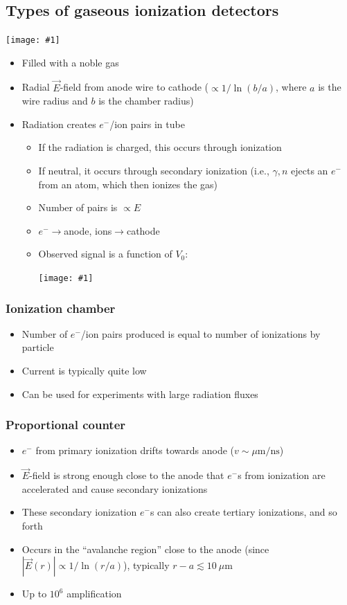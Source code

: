 \documentclass[11pt]{article}
\newcommand{\E}{\ensuremath{\vec{E}}}
\newcommand{\ns}{\text{ns}}
\newcommand{\mum}{\mu\text{m}}
\newcommand{\el}{\ensuremath{e^{-}}\xspace}
\newcommand{\embedimgw}[2]{\begin{center}\texttt{[image: \#1]}\end{center}}
\begin{document}
\subsection{Types of gaseous ionization detectors}
\embedimgw{figs/gasionization.png}{.8}
\begin{itemize}
  \item Filled with a noble gas
  \item Radial $\E$-field from anode wire to cathode ($\propto 1/\ln(b/a)$, where $a$ is the wire radius and $b$ is the chamber radius)
  \item Radiation creates $\el$/ion pairs in tube
  \begin{itemize}
    \item If the radiation is charged, this occurs through ionization
    \item If neutral, it occurs through secondary ionization (i.e., $\gamma,n$ ejects an $\el$ from an atom, which then ionizes the gas)
    \item Number of pairs is $\propto E$
    \item $\el\rightarrow$anode, ions$\rightarrow$cathode
    \item Observed signal is a function of $V_0$:
    \embedimgw{figs/ionization_voltage}{0.8}
  \end{itemize}
\end{itemize}
\subsubsection{Ionization chamber}
\begin{itemize}
  \item Number of $\el$/ion pairs produced is equal to number of ionizations by particle
  \item Current is typically quite low
  \item Can be used for experiments with large radiation fluxes
\end{itemize}
\subsubsection{Proportional counter}
\begin{itemize}
  \item $\el$ from primary ionization drifts towards anode ($v\sim \mum/\ns$)
  \item $\E$-field is strong enough close to the anode that $\el$s from ionization are accelerated and cause secondary ionizations
  \item These secondary ionization $\el$s can also create tertiary ionizations, and so forth
  \item Occurs in the ``avalanche region'' close to the anode (since $|\vec E(r)|\propto 1/\ln(r/a)$), typically $r-a \lesssim 10~\mum$
  \item Up to $10^6$ amplification
\end{itemize}
\end{document}
